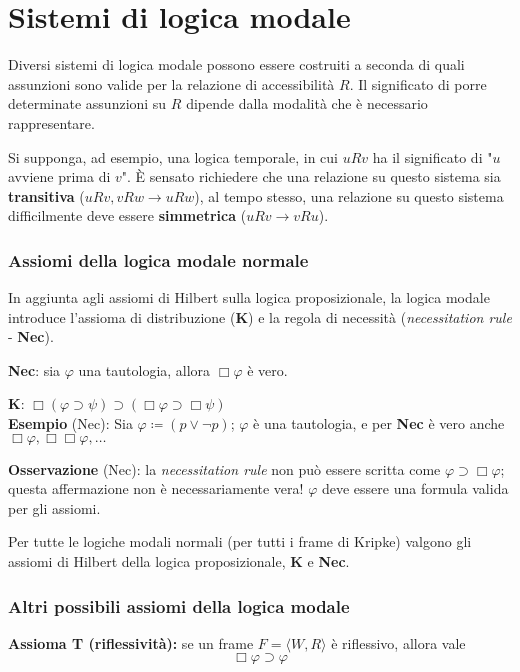 \chapter{Sistemi di logica modale}

Diversi sistemi di logica modale possono essere costruiti a seconda di quali assunzioni sono valide per la relazione di accessibilità $R$. Il significato di porre determinate assunzioni su $R$ dipende dalla modalità che è necessario rappresentare.

Si supponga, ad esempio, una logica temporale, in cui $uRv$ ha il significato di "$u$ avviene prima di $v$". È sensato richiedere che una relazione su questo sistema sia \textbf{transitiva} ($uRv, vRw \to uRw$), al tempo stesso, una relazione su questo sistema difficilmente deve essere \textbf{simmetrica} ($uRv \to vRu$).

\subsection{Assiomi della logica modale normale}

In aggiunta agli assiomi di Hilbert sulla logica proposizionale, la logica modale introduce l'assioma di distribuzione (\textbf{K}) e la regola di necessità (\textit{necessitation rule} - \textbf{Nec}).

\textbf{Nec}: sia $\varphi$ una tautologia, allora $\Box \varphi$ è vero.

\textbf{K}: $\Box (\varphi \supset \psi) \supset (\Box \varphi \supset \Box \psi)$
\\

\textbf{Esempio} (Nec): Sia $\varphi \coloneqq (p \lor \lnot p)$; $\varphi$ è una tautologia, e per \textbf{Nec} è vero anche $\Box \varphi, \Box \Box \varphi, \dots$

\textbf{Osservazione} (Nec): la \textit{necessitation rule} non può essere scritta come $\varphi \supset \Box \varphi$; questa affermazione non è necessariamente vera! $\varphi$ deve essere una formula valida per gli assiomi.

Per tutte le logiche modali normali (per tutti i frame di Kripke) valgono gli assiomi di Hilbert della logica proposizionale, \textbf{K} e \textbf{Nec}.


\subsection{Altri possibili assiomi della logica modale}

\textbf{Assioma T (riflessività):} se un frame $F = \langle W, R \rangle$ è riflessivo, allora vale $$\Box \varphi \supset \varphi$$

